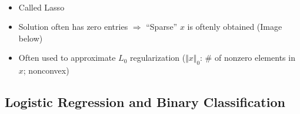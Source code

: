 \begin{itemize}
\begin{equation}
\begin{aligned}
    \end{aligned}\end{equation}
    \begin{itemize}
        \item Called Lasso
        \item Solution often has zero entries $\Rightarrow$ ``Sparse'' $x$ is oftenly obtained (Image below)
        \item Often used to approximate $L_0$ regularization ($\Vert x\Vert_0$: \# of nonzero elements in $x$; nonconvex)
    \end{itemize}
    \begin{figures}
    \end{figures}
\end{itemize}

\subsection{Logistic Regression and Binary Classification}

